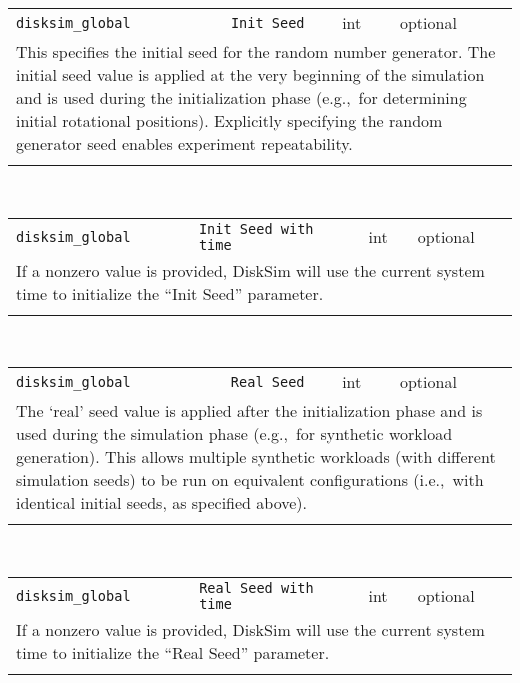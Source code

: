 \noindent 
\begin{tabular}{|p{1.5in}|p{3.5in}|p{0.5in}|p{0.5in}|}
\cline{1-4}
\texttt{disksim\_global} & \texttt{Init Seed} & int & optional \\ 
\cline{1-4}
\multicolumn{4}{|p{6in}|}{
This specifies the initial seed for the random number generator.
The initial seed value is applied at the very beginning of the
simulation and is used during the initialization phase (e.g.,~for
determining initial rotational positions). Explicitly specifying the
random generator seed enables experiment repeatability.
}\\ 
\cline{1-4}
\multicolumn{4}{p{5in}}{}\\
\end{tabular}\\ 
\noindent 
\begin{tabular}{|p{1.5in}|p{3.5in}|p{0.5in}|p{0.5in}|}
\cline{1-4}
\texttt{disksim\_global} & \texttt{Init Seed with time} & int & optional \\ 
\cline{1-4}
\multicolumn{4}{|p{6in}|}{
If a nonzero value is provided, DiskSim will use the current system
time to initialize the ``Init Seed'' parameter.
}\\ 
\cline{1-4}
\multicolumn{4}{p{5in}}{}\\
\end{tabular}\\ 
\noindent 
\begin{tabular}{|p{1.5in}|p{3.5in}|p{0.5in}|p{0.5in}|}
\cline{1-4}
\texttt{disksim\_global} & \texttt{Real Seed} & int & optional \\ 
\cline{1-4}
\multicolumn{4}{|p{6in}|}{
The `real' seed value is applied after the initialization phase
and is used during the simulation phase (e.g.,~for synthetic
workload generation). This allows multiple synthetic workloads
(with different simulation seeds) to be run on equivalent
configurations (i.e.,~with identical initial seeds,
as specified above).
}\\ 
\cline{1-4}
\multicolumn{4}{p{5in}}{}\\
\end{tabular}\\ 
\noindent 
\begin{tabular}{|p{1.5in}|p{3.5in}|p{0.5in}|p{0.5in}|}
\cline{1-4}
\texttt{disksim\_global} & \texttt{Real Seed with time} & int & optional \\ 
\cline{1-4}
\multicolumn{4}{|p{6in}|}{
If a nonzero value is provided, DiskSim will use the current system
time to initialize the ``Real Seed'' parameter.
}\\ 
\cline{1-4}
\multicolumn{4}{p{5in}}{}\\
\end{tabular}\\ 
